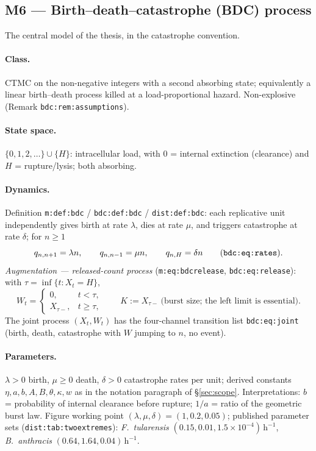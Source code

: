 \documentclass[11pt,a4paper]{article}
\begin{document}
\subsection{M6 --- Birth--death--catastrophe (BDC) process}
\label{sec:M6}

The central model of the thesis, in the catastrophe convention.

\paragraph{Class.} CTMC on the non-negative integers with a second
absorbing state; equivalently a linear birth--death process killed at a
load-proportional hazard. Non-explosive (Remark \texttt{bdc:rem:assumptions}).

\paragraph{State space.} $\{0,1,2,\ldots\}\cup\{H\}$: intracellular load,
with $0$ = internal extinction (clearance) and $H$ = rupture/lysis; both
absorbing.

\paragraph{Dynamics.} Definition \texttt{m:def:bdc} / \texttt{bdc:def:bdc} /
\texttt{dist:def:bdc}: each replicative unit independently gives birth at
rate $\lambda$, dies at rate $\mu$, and triggers catastrophe at rate
$\delta$; for $n\ge1$
\[
q_{n,n+1}=\lambda n,\qquad q_{n,n-1}=\mu n,\qquad q_{n,H}=\delta n
\qquad\text{(\texttt{bdc:eq:rates})}.
\]
\emph{Augmentation --- released-count process} (\texttt{m:eq:bdcrelease},
\texttt{bdc:eq:release}): with $\tau=\inf\{t:X_t=H\}$,
\[
W_t=\begin{cases}0,&t<\tau,\\ X_{\tau-},&t\ge\tau,\end{cases}
\qquad K:=X_{\tau-}\ \text{(burst size; the left limit is essential)}.
\]
The joint process $(X_t,W_t)$ has the four-channel transition list
\texttt{bdc:eq:joint} (birth, death, catastrophe with $W$ jumping to $n$,
no event).

\paragraph{Parameters.} $\lambda>0$ birth, $\mu\ge0$ death, $\delta>0$
catastrophe rates per unit; derived constants $\eta,a,b,A,B,\theta,\kappa,w$
as in the notation paragraph of \S\ref{sec:scope}. Interpretations: $b$ = probability of internal
clearance before rupture; $1/a$ = ratio of the geometric burst law.
Figure working point $(\lambda,\mu,\delta)=(1,0.2,0.05)$; published
parameter sets (\texttt{dist:tab:twoextremes}): \emph{F.\ tularensis}
$(0.15,0.01,1.5\times10^{-4})\,\mathrm h^{-1}$, \emph{B.\ anthracis}
$(0.64,1.64,0.04)\,\mathrm h^{-1}$.
\end{document}
